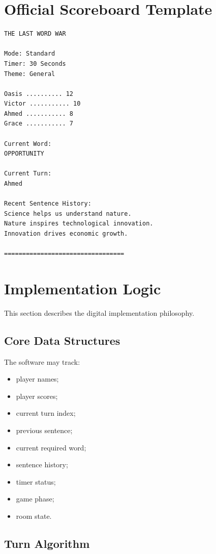 \documentclass[11pt,a4paper]{article}
\begin{document}
\section{Official Scoreboard Template}

\begin{verbatim}
THE LAST WORD WAR

Mode: Standard
Timer: 30 Seconds
Theme: General

Oasis .......... 12
Victor ........... 10
Ahmed ........... 8
Grace ........... 7

Current Word:
OPPORTUNITY

Current Turn:
Ahmed

Recent Sentence History:
Science helps us understand nature.
Nature inspires technological innovation.
Innovation drives economic growth.

=================================
\end{verbatim}

\section{Implementation Logic}

This section describes the digital implementation philosophy.

\subsection{Core Data Structures}

The software may track:

\begin{itemize}
    \item player names;
    \item player scores;
    \item current turn index;
    \item previous sentence;
    \item current required word;
    \item sentence history;
    \item timer status;
    \item game phase;
    \item room state.
\end{itemize}

\subsection{Turn Algorithm}
\end{document}
